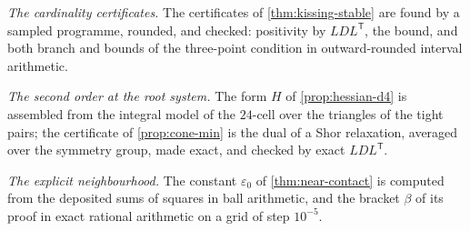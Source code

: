 \documentclass[11pt,reqno]{amsart}
\renewcommand{\_}{\origunderscore\allowbreak}
\numberwithin{equation}{section}
\theoremstyle{plain}
\theoremstyle{definition}
\theoremstyle{remark}
\begin{document}
\emph{The cardinality certificates.} The certificates of
\cref{thm:kissing-stable} are found by a sampled programme, rounded, and
checked: positivity by $LDL^{\mathsf T}$, the bound, and both branch and
bounds of the three-point condition in outward-rounded interval
arithmetic.

\emph{The second order at the root system.} The form $H$ of
\cref{prop:hessian-d4} is assembled from the integral model of the
$24$-cell over the triangles of the tight pairs; the certificate of
\cref{prop:cone-min} is the dual of a Shor relaxation, averaged over the
symmetry group, made exact, and checked by exact $LDL^{\mathsf T}$.

\emph{The explicit neighbourhood.} The constant $\varepsilon_0$ of
\cref{thm:near-contact} is computed from the deposited sums of squares in
ball arithmetic, and the bracket $\beta$ of its proof in exact rational
arithmetic on a grid of step $10^{-5}$.
\end{document}
